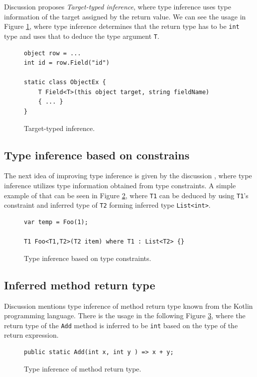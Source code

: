 Discussion \cite{online:RetTInference} proposes \textit{Target-typed inference}, where type inference uses type information of the target assigned by the return value. 
We can see the usage in Figure \ref{img62:RetTInf}, where type inference determines that the return type has to be \texttt{int} type and uses that to deduce the type argument \texttt{T}.
\begin{figure}[h]
\begin{lstlisting}[style=csharp]
object row = ...
int id = row.Field("id")

static class ObjectEx {
	T Field<T>(this object target, string fieldName) 
	{ ... }
}
\end{lstlisting}
\caption{Target-typed inference.}
\label{img62:RetTInf}
\end{figure}

\subsection{Type inference based on constrains} \label{sect11:is6}

The next idea of improving type inference is given by the discussion \cite{online:TInfConst}, where type inference utilizes type information obtained from type constraints.
A simple example of that can be seen in Figure \ref{img23:TInfConst}, where \texttt{T1} can be deduced by using \texttt{T1}'s constraint and inferred type of \texttt{T2} forming inferred type \texttt{List<int>}.
\begin{figure}[h!]
\begin{lstlisting}[style=csharp]
var temp = Foo(1);

T1 Foo<T1,T2>(T2 item) where T1 : List<T2> {}
\end{lstlisting}
\caption{Type inference based on type constraints.}
\label{img23:TInfConst}
\end{figure}

\subsection{Inferred method return type} \label{sect12:is7}

Discussion \cite{online:TMRetInf} mentions type inference of method return type known from the Kotlin programming language.
There is the usage in the following Figure \ref{img24:TMRetInf}, where the return type of the \texttt{Add} method is inferred to be \texttt{int} based on the type of the return expression.
\begin{figure}[h!]
\begin{lstlisting}[style=csharp]
public static Add(int x, int y ) => x + y;
\end{lstlisting}
\caption{Type inference of method return type.}
\label{img24:TMRetInf}
\end{figure}

